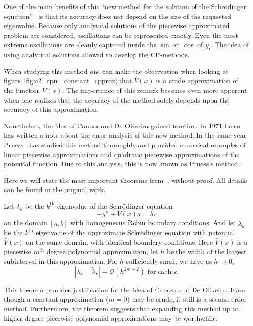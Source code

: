 One of the main benefits of this ``new method for the solution of the Schrödinger equation''~\cite{canosa_new_1970} is that its accuracy does not depend on the size of the requested eigenvalue. Because only analytical solutions of the piecewise approximated problem are considered, oscillations can be represented exactly. Even the most extreme oscillations are cleanly captured inside the $\sin$ en $\cos$ of $y_i$. The idea of using analytical solutions allowed to develop the CP-methods.

When studying this method one can make the observation when looking at figure~\ref{fig:c2_cpm_constant_approx} that $\bar{V}(x)$ is a crude approximation of the function $V(x)$. The importance of this remark becomes even more apparent when one realizes that the accuracy of the method solely depends upon the accuracy of this approximation.

Nonetheless, the idea of Canosa and De Oliveira gained traction. In 1971 Ixaru~\cite{ixaru_error_1972} has written a note about the error analysis of this new method. In the same year Pruess~\cite{pruess_estimating_1973} has studied this method thoroughly and provided numerical examples of linear piecewise approximations and quadratic piecewise approximations of the potential function. Due to this analysis, this is now known as Pruess's method.

Here we will state the most important theorems from~\cite{pruess_estimating_1973}, without proof. All details can be found in the original work.

\begin{theorem}[Pruess 1973]\label{the:c2_pruess_1973_1}
    Let $\lambda_k$ be the $k^\text{th}$ eigenvalue of the Schrödinger equation
    $$
        -y'' + V(x) y = \lambda y
    $$
    on the domain $[a, b]$ with homogeneous Robin boundary conditions. And let $\tilde{\lambda}_k$ be the $k^\text{th}$ eigenvalue of the approximate Schrödinger equation with potential $\bar{V}(x)$ on the same domain, with identical boundary conditions. Here $\bar{V}(x)$ is a piecewise $m^\text{th}$ degree polynomial approximation, let $h$ be the width of the largest subinterval in this approximation. For $h$ sufficiently small, we have as $h \to 0$,
    $$
        |\lambda_k - \tilde{\lambda}_k| = \mathcal{O}(h^{2m + 2}) \text{ for each $k$.}
    $$
\end{theorem}

This theorem provides justification for the idea of Canosa and De Oliveira. Even though a constant approximation ($m = 0$) may be crude, it still is a second order method. Furthermore, the theorem suggests that expanding this method up to higher degree piecewise polynomial approximations may be worthwhile.


